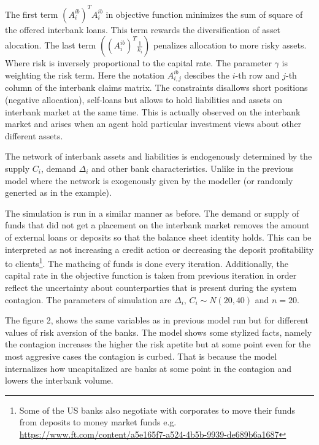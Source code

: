 \documentclass{article}
\begin{document}
The first term $(A^{ib}_i)^T A^{ib}_i$ in objective function minimizes the sum of square of the offered interbank loans. This term rewards the diversification of asset alocation. The last term $\left((A^{ib}_i)^T \frac{1}{k_i}\right)$ penalizes allocation to more risky assets. Where risk is inversely proportional to the capital rate. The parameter $\gamma$ is weighting the risk term. Here the notation $A^{ib}_{i,j}$ descibes the $i$-th row and $j$-th column of the interbank claims matrix. The constraints disallows short positions (negative allocation), self-loans but allows to hold liabilities and assets on interbank market at the same time. This is actually observed on the interbank market and arises when an agent hold particular investment views about other different assets. 

The network of interbank assets and liabilities is endogenously determined by the supply $C_i$, demand $\Delta_i$ and other bank characteristics. Unlike in the previous model where the network is exogenously given by the modeller (or randomly generted as in the example). 

The simulation is run in a similar manner as before. The demand or supply of funds that did not get a placement on the interbank market removes the amount of external loans or deposits so that the balance sheet identity holds. This can be interpreted as not increasing a credit action or decreasing the deposit profitability to clients\footnote[1]{Some of the US banks also negotiate with corporates to move their funds from deposits to money market funds e.g. \url{https://www.ft.com/content/a5e165f7-a524-4b5b-9939-de689b6a1687}}. The mathcing of funds is done every iteration. Additionally, the capital rate in the objective function is taken from previous iteration in order reflect the uncertainty about counterparties that is present during the system contagion. The parameters of simulation are $\Delta_i , \, C_i \sim N(20, 40)$ and $n = 20$.
 

The figure 2, shows the same variables as in previous model run but for different values of risk aversion of the banks. The model shows some stylized facts, namely the contagion increases the higher the risk apetite but at some point even for the most aggresive cases the contagion is curbed. That is because the model internalizes how uncapitalized are banks at some point in the contagion and lowers the interbank volume. 
\end{document}

